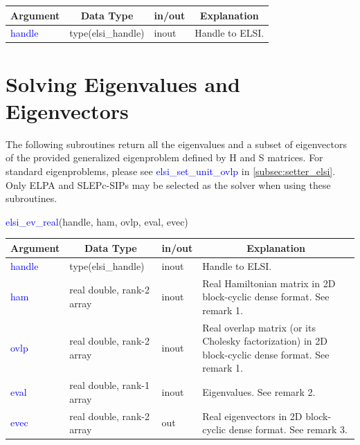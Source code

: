 \documentclass{report}
\begin{document}
\begin{tabular}[]{|p{30mm}|p{30mm}|p{15mm}|p{90mm}|}
\hline
\multicolumn{1}{|c|}{\textbf{Argument}} & \multicolumn{1}{c|}{\textbf{Data Type}} & \multicolumn{1}{c|}{\textbf{in/out}} & \multicolumn{1}{c|}{\textbf{Explanation}}\\
\hline
\textcolor{blue}{handle} & type(elsi\_handle) & inout & Handle to ELSI.\\
\hline
\end{tabular}

\section{Solving Eigenvalues and Eigenvectors}
\label{sec:ev}
The following subroutines return all the eigenvalues and a subset of eigenvectors of the provided generalized eigenproblem defined by H and S matrices.  For standard eigenproblems, please see \textcolor{blue}{elsi\_set\_unit\_ovlp} in \ref{subsec:setter_elsi}.  Only ELPA and SLEPc-SIPs may be selected as the solver when using these subroutines.

\newpage
\begin{labeling}{\hspace{6cm}}
\item [\hspace{0.3cm} \textcolor{blue}{elsi\_ev\_real}(handle, ham, ovlp, eval, evec)]
\end{labeling}

\begin{tabular}[]{|p{20mm}|p{45mm}|p{15mm}|p{85mm}|}
\hline
\multicolumn{1}{|c|}{\textbf{Argument}} & \multicolumn{1}{c|}{\textbf{Data Type}} & \multicolumn{1}{c|}{\textbf{in/out}} & \multicolumn{1}{c|}{\textbf{Explanation}}\\
\hline
\textcolor{blue}{handle} & type(elsi\_handle)        & inout & Handle to ELSI.\\
\hline
\textcolor{blue}{ham}    & real double, rank-2 array & inout & Real Hamiltonian matrix in 2D block-cyclic dense format.  See remark 1.\\
\hline
\textcolor{blue}{ovlp}   & real double, rank-2 array & inout & Real overlap matrix (or its Cholesky factorization) in 2D block-cyclic dense format.  See remark 1.\\
\hline
\textcolor{blue}{eval}   & real double, rank-1 array & inout & Eigenvalues.  See remark 2.\\
\hline
\textcolor{blue}{evec}   & real double, rank-2 array & out   & Real eigenvectors in 2D block-cyclic dense format.  See remark 3.\\
\hline
\end{tabular}
\end{document}
